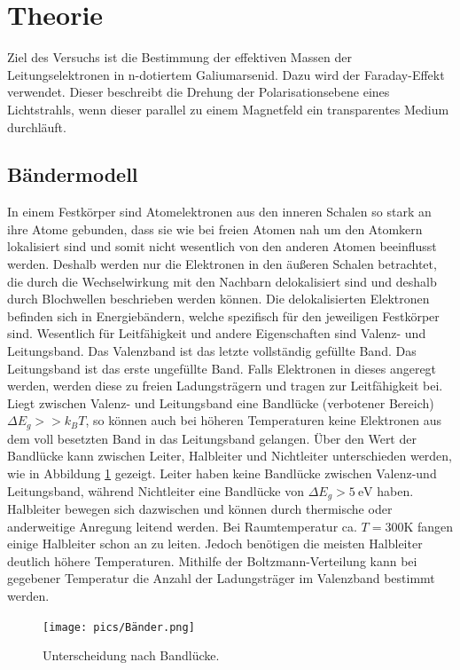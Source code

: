 \section{Theorie}
\label{sec:Theorie}
Ziel des Versuchs ist die Bestimmung der effektiven Massen der Leitungselektronen in n-dotiertem Galiumarsenid.
Dazu wird der Faraday-Effekt verwendet. Dieser beschreibt die Drehung der Polarisationsebene eines Lichtstrahls, wenn dieser parallel zu einem Magnetfeld
ein transparentes Medium durchläuft.

\subsection{Bändermodell}
In einem Festkörper sind
Atomelektronen aus den inneren Schalen so stark an ihre Atome gebunden, dass sie wie bei freien Atomen nah um den Atomkern lokalisiert sind
und somit nicht wesentlich von den anderen Atomen beeinflusst werden. Deshalb werden nur die Elektronen in den äußeren Schalen betrachtet,
die durch die Wechselwirkung mit den Nachbarn delokalisiert sind und deshalb durch Blochwellen beschrieben werden können.
Die delokalisierten Elektronen befinden sich in Energiebändern, welche spezifisch für den jeweiligen Festkörper sind.
Wesentlich für Leitfähigkeit und andere Eigenschaften sind Valenz- und Leitungsband. Das Valenzband ist das letzte vollständig gefüllte Band.
Das Leitungsband ist das erste ungefüllte Band. Falls Elektronen in dieses angeregt werden, werden diese zu freien Ladungsträgern und tragen zur Leitfähigkeit bei.
Liegt zwischen Valenz- und Leitungsband eine Bandlücke (verbotener Bereich) $\Delta E_g >> k_B T$, so können auch bei höheren Temperaturen keine
Elektronen aus dem voll besetzten Band in das Leitungsband gelangen. Über den Wert der Bandlücke kann zwischen Leiter, Halbleiter und Nichtleiter
unterschieden werden, wie in Abbildung \ref{pic:bander} gezeigt. Leiter haben keine Bandlücke zwischen Valenz-und Leitungsband, während Nichtleiter eine Bandlücke von $\Delta E_g > \SI{5}{\eV}$ haben.
Halbleiter bewegen sich dazwischen und können durch thermische oder anderweitige Anregung leitend werden. Bei Raumtemperatur ca. $T = 300 \si{\kelvin}$ fangen einige Halbleiter schon an zu leiten.
Jedoch benötigen die meisten Halbleiter deutlich höhere Temperaturen. Mithilfe der Boltzmann-Verteilung kann bei gegebener Temperatur die Anzahl der Ladungsträger im Valenzband bestimmt werden.
\begin{figure}
    \centering
    \texttt{[image: pics/Bänder.png]}
    \caption{Unterscheidung nach Bandlücke.\cite{wikipedia}}
    \label{pic:bander}
\end{figure}

